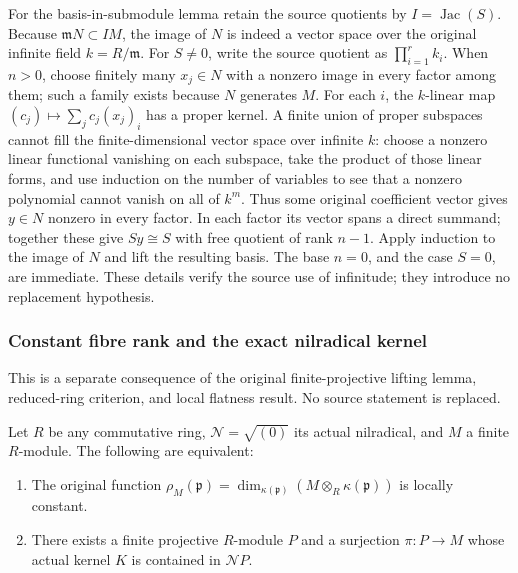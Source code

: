 For the basis-in-submodule lemma retain the source quotients by \(I=\operatorname{Jac}(S)\). Because \(\mathfrak mN\subset IM\), the image of \(N\) is indeed a vector space over the original infinite field \(k=R/\mathfrak m\). For \(S\ne0\), write the source quotient as \(\prod_{i=1}^r k_i\). When \(n>0\), choose finitely many \(x_j\in N\) with a nonzero image in every factor among them; such a family exists because \(N\) generates \(M\). For each \(i\), the \(k\)-linear map \((c_j)\mapsto\sum_j c_j(x_j)_i\) has a proper kernel. A finite union of proper subspaces cannot fill the finite-dimensional vector space over infinite \(k\): choose a nonzero linear functional vanishing on each subspace, take the product of those linear forms, and use induction on the number of variables to see that a nonzero polynomial cannot vanish on all of \(k^m\). Thus some original coefficient vector gives \(y\in N\) nonzero in every factor. In each factor its vector spans a direct summand; together these give \(Sy\cong S\) with free quotient of rank \(n-1\). Apply induction to the image of \(N\) and lift the resulting basis. The base \(n=0\), and the case \(S=0\), are immediate. These details verify the source use of infinitude; they introduce no replacement hypothesis.

\subsubsection{Constant fibre rank and the exact nilradical kernel}\label{constant-fibre-rank-and-the-exact-nilradical-kernel}

This is a separate consequence of the original finite-projective lifting lemma, reduced-ring criterion, and local flatness result. No source statement is replaced.

Let \(R\) be any commutative ring, \(\mathcal N=\sqrt{(0)}\) its actual nilradical, and \(M\) a finite \(R\)-module. The following are equivalent:

\begin{enumerate}
\def\labelenumi{\arabic{enumi}.}
\tightlist
\item
  The original function \(\rho_M(\mathfrak p)=\dim_{\kappa(\mathfrak p)}(M\otimes_R\kappa(\mathfrak p))\) is locally constant.
\item
  There exists a finite projective \(R\)-module \(P\) and a surjection \(\pi:P\to M\) whose actual kernel \(K\) is contained in \(\mathcal NP\).
\end{enumerate}

